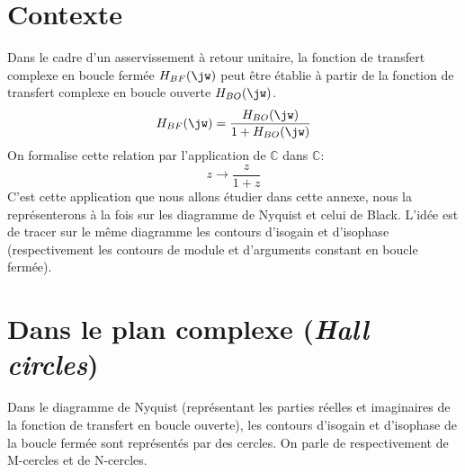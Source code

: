 \section{Contexte}

Dans le cadre d'un asservissement à retour unitaire, la fonction de transfert 
complexe en boucle fermée $H_{BF}(\jw)$ peut être établie à partir de la 
fonction de transfert complexe en boucle ouverte $H_{BO}(\jw)$.
\[
    H_{BF}(\jw)=\dfrac{H_{BO}(\jw)}{1+H_{BO}(\jw)}
\]
On formalise cette relation par l'application de $\mathbb{C}$ dans  $\mathbb{C}$:
\begin{equation*}
    z\to\dfrac{z}{1+z}
\end{equation*}
C'est cette application que nous allons étudier dans cette annexe, nous la 
représenterons à la fois sur les diagramme de Nyquist et celui de Black.
L'idée est de tracer sur le même diagramme les contours d'isogain et d'isophase 
(respectivement les contours de module et d'arguments constant 
en boucle fermée).
\section{Dans le plan complexe (\emph{Hall circles})}
Dans le diagramme de Nyquist (représentant les parties réelles et imaginaires de 
la fonction de transfert en boucle ouverte), les contours d'isogain et 
d'isophase de la boucle fermée sont représentés par des cercles. 
On parle de respectivement de M-cercles et de N-cercles. 
